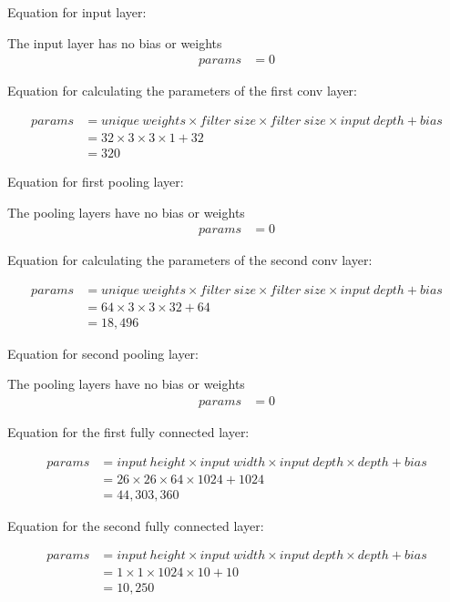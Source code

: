 Equation for input layer:

The input layer has no bias or weights
\begin{align*}
	params &= 0
\end{align*}

Equation for calculating the parameters of the first conv layer:

\begin{align*}
	params &= unique\ weights \times filter\ size \times filter\ size \times input\ depth + bias \\
	&= 32 \times 3 \times 3 \times 1 + 32\\
	&= 320
\end{align*}

Equation for first pooling layer:

The pooling layers have no bias or weights
\begin{align*}
	params &= 0
\end{align*}

Equation for calculating the parameters of the second conv layer:

\begin{align*}
	params &= unique\ weights \times filter\ size \times filter\ size \times input\ depth + bias\\
	&= 64 \times 3 \times 3 \times 32 + 64\\
	&= 18,496
\end{align*}

Equation for second pooling layer:

The pooling layers have no bias or weights
\begin{align*}
	params &= 0
\end{align*}

Equation for the first fully connected layer:

\begin{align*}
	params &= input\ height \times input\ width \times input\ depth \times depth + bias\\
	&= 26 \times 26 \times 64 \times 1024 + 1024\\
	&= 44,303,360
\end{align*}

Equation for the second fully connected layer:

\begin{align*}
	params &= input\ height \times input\ width \times input\ depth \times depth + bias\\
	&= 1 \times 1 \times 1024 \times 10 + 10\\
	&= 10,250
\end{align*}

